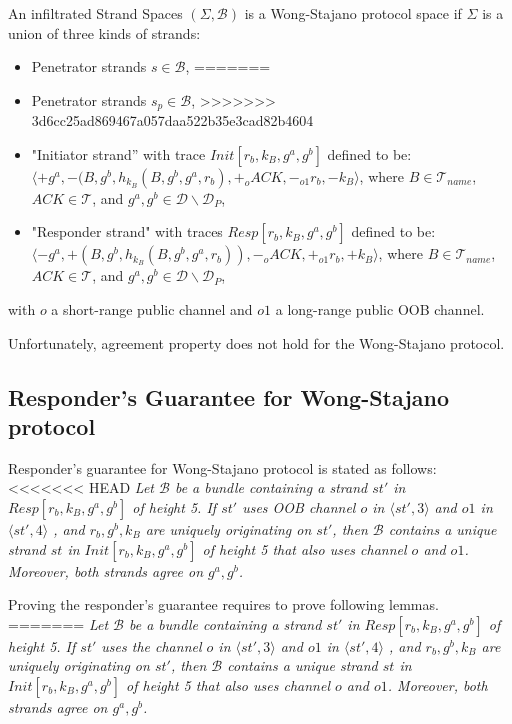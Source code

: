 \begin{itemize}
\begin{Definition}
An infiltrated Strand Spaces $(\Sigma,\mathcal{B})$ is a Wong-Stajano protocol space if $\Sigma$ is a union of three kinds of strands:
\begin{itemize}
<<<<<<< HEAD
\item Penetrator strands $s \in \mathcal{B}$,
=======
\item Penetrator strands $s_p \in \mathcal{B}$,
>>>>>>> 3d6cc25ad869467a057daa522b35e3cad82b4604
\item "Initiator strand'' with trace $Init[r_b, k_B,g^a,g^b]$ defined to be: \\ 
{\footnotesize $\langle +g^a,-(B, g^b, h_{k_B}(B,g^b,g^a,r_b),+_o ACK,-_{o1}r_b,-k_B \rangle$, where $B \in \mathcal{T}_{name}$, $ACK \in \mathcal{T}$, and $g^a,g^b \in \mathcal{D} \backslash \mathcal{D}_{P}$,}
\item "Responder strand" with traces $Resp[r_b, k_B,g^a,g^b]$ defined to be: \\ {\footnotesize $\langle -g^a,+(B, g^b, h_{k_B}(B,g^b,g^a,r_b)),-_o ACK,+_{o1} r_b,+k_B \rangle$, where $B \in \mathcal{T}_{name}$, $ACK \in \mathcal{T}$, and $g^a,g^b \in \mathcal{D} \backslash \mathcal{D}_{P}$,}
\end{itemize}
with $o$ a short-range public channel and $o1$ a long-range public OOB channel.
\end{Definition}

Unfortunately, agreement property does not hold for the Wong-Stajano protocol. 

\subsection{Responder's Guarantee for Wong-Stajano protocol} 

Responder's guarantee for Wong-Stajano protocol is stated as follows:\\
<<<<<<< HEAD
\textit{Let $\mathcal{B}$ be a bundle containing a strand $st'$ in $Resp[r_b, k_B,g^a,g^b]$ of height 5. If $st'$ uses OOB channel $o$ in $\langle st',3 \rangle$ and $o1$ in $\langle st',4 \rangle$ , and $r_b, g^b, k_B$ are uniquely originating on $st'$, then $\mathcal{B}$ contains a unique strand $st$ in $Init[r_b, k_B,g^a,g^b]$ of height 5 that also uses channel $o$ and $o1$. Moreover, both strands agree on $g^a,g^b$.}

Proving the responder's guarantee requires to prove following lemmas.
=======
\textit{Let $\mathcal{B}$ be a bundle containing a strand $st'$ in $Resp[r_b, k_B,g^a,g^b]$ of height 5. If $st'$ uses the channel $o$ in $\langle st',3 \rangle$ and $o1$ in $\langle st',4 \rangle$ , and $r_b, g^b, k_B$ are uniquely originating on $st'$, then $\mathcal{B}$ contains a unique strand $st$ in $Init[r_b, k_B,g^a,g^b]$ of height 5 that also uses channel $o$ and $o1$. Moreover, both strands agree on $g^a,g^b$.}


\end{itemize}
